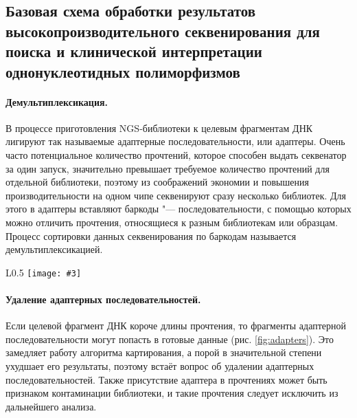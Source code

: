 \documentclass[a4paper,12pt]{article}
\newcommand{\figa}[5]{
\begin{wrapfigure}{#1}{#2\textwidth}
\centering
\texttt{[image: \#3]}
\caption{\label{#4}#5}
\end{wrapfigure}
}
\begin{document}
\subsection{Базовая схема обработки результатов высокопроизводительного секвенирования для поиска и клинической интерпретации однонуклеотидных полиморфизмов}

\paragraph{Демультиплексикация.}
В процессе приготовления NGS-библиотеки к целевым фрагментам ДНК лигируют так называемые адаптерные последовательности, или адаптеры.
Очень часто потенциальное количество прочтений, которое способен выдать секвенатор за один запуск, значительно превышает требуемое количество прочтений для отдельной библиотеки, поэтому из соображений экономии и повышения производительности на одном чипе секвенируют сразу несколько библиотек.
Для этого в адаптеры вставляют баркоды "--- последовательности, с помощью которых можно отличить прочтения, относящиеся к разным библиотекам или образцам.
Процесс сортировки данных секвенирования по баркодам называется демультиплексикацией.

\figa{L}{0.5}{Adapters.pdf}{fig:adapters}{Фрагменты адаптерных последовательностей в данных секвенирования}

\paragraph{Удаление адаптерных последовательностей.}
Если целевой фрагмент ДНК короче длины прочтения, то фрагменты адаптерной последовательности могут попасть в готовые данные (рис. \ref{fig:adapters}).
Это замедляет работу алгоритма картирования, а порой в значительной степени ухудшает его результаты, поэтому встаёт вопрос об удалении адаптерных последовательностей.
Также присутствие адаптера в прочтениях может быть признаком контаминации библиотеки, и такие прочтения следует исключить из дальнейшего анализа\cite{Martin_2011}.
\end{document}
